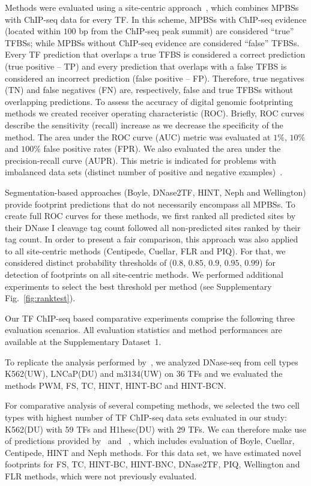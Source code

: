 \documentclass[11pt]{article}
\begin{document}
Methods were evaluated using a site-centric approach~\citep{cuellar2012}, which combines MPBSs with ChIP-seq data for every TF. In this scheme, MPBSs with ChIP-seq evidence (located within $100$ bp from the ChIP-seq peak summit) are considered ``true'' TFBSs; while MPBSs without ChIP-seq evidence are considered ``false'' TFBSs. Every TF prediction that overlaps a true TFBS is considered a correct prediction (true positive -- TP) and every prediction that overlaps with a false TFBS is considered an incorrect prediction (false positive -- FP). Therefore, true negatives (TN) and false negatives (FN) are, respectively, false and true TFBSs without overlapping predictions. To assess the accuracy of digital genomic footprinting methods we created receiver operating characteristic (ROC). Briefly, ROC curves describe the sensitivity (recall) increase as we decrease the specificity of the method. The area under the ROC curve (AUC) metric was evaluated at $1\%$, $10\%$ and $100\%$ false positive rates (FPR). We also evaluated the area under the precision-recall curve (AUPR). This metric is indicated for problems with imbalanced data sets (distinct number of positive and negative examples)~\citep{davis2006,fawcett2006}.

Segmentation-based approaches (Boyle, DNase2TF, HINT, Neph and Wellington) provide footprint predictions that do not necessarily encompass all MPBSs. To create full ROC curves for these methods, we first ranked all predicted sites by their DNase I cleavage tag count followed all non-predicted sites ranked by their tag count. In order to present a fair comparison, this approach was also applied to all site-centric methods (Centipede, Cuellar, FLR and PIQ). For that, we considered distinct probability thresholds of ($0.8$, $0.85$, $0.9$, $0.95$, $0.99$) for detection of footprints on all site-centric methods. We performed additional experiments to select the best threshold per method (see Supplementary Fig.~\ref{fig:ranktest}).

Our TF ChIP-seq based comparative experiments comprise the following three evaluation scenarios. All evaluation statistics and method performances are available at the Supplementary Dataset~1.

 To replicate the analysis performed by~\cite{he2014}, we analyzed DNase-seq from cell types K562(UW), LNCaP(DU) and m3134(UW) on 36 TFs and we evaluated the methods PWM, FS, TC, HINT, HINT-BC and HINT-BCN.

 For comparative analysis of several competing methods, we selected the two cell types with highest number of TF ChIP-seq data sets evaluated in our study: K562(DU) with 59 TFs and H1hesc(DU) with 29 TFs. We can therefore make use of predictions provided by~\cite{gusmao2014} and ~\cite{boyle2011}, which includes evaluation of Boyle, Cuellar, Centipede, HINT and Neph methods. For this data set, we have estimated novel footprints for FS, TC, HINT-BC, HINT-BNC, DNase2TF, PIQ, Wellington and FLR methods, which were not previously evaluated.
\end{document}
